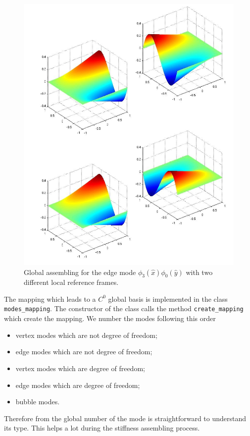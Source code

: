 \begin{figure}
\centering
\includegraphics[scale=0.25]{images/basis_assembling_mod.jpg}
\caption{Global assembling for the edge mode $\phi_3(\hat{x})\phi_0(\hat{y})$ with two different local reference frames.}\label{fig:basis_assembling}
\end{figure}

The mapping which leads to a $C^0$ global basis is implemented in the class \verb|modes_mapping|. The constructor of the class calls the method \verb|create_mapping| which create the mapping. We number the modes following this order
\begin{itemize}
  \item vertex modes which are not degree of freedom;
  \item edge modes which are not degree of freedom;
  \item vertex modes which are degree of freedom;
  \item edge modes which are degree of freedom;
  \item bubble modes.
\end{itemize}
Therefore from the global number of the mode is straightforward to understand its type. This helps a lot during the stiffness assembling process.
\medskip

